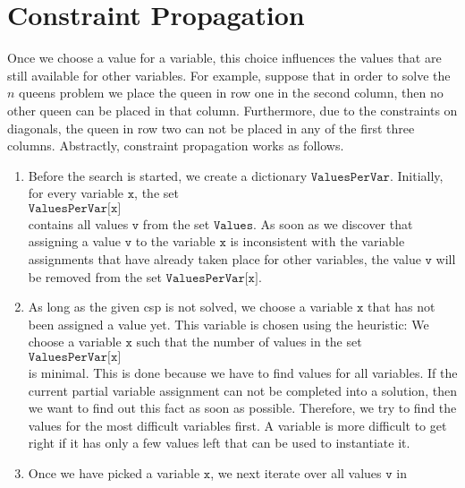 \section{Constraint Propagation}
Once we choose a value for a variable, this choice influences the values that are still available for other variables.
For example, suppose that in order to solve the $n$ queens problem we place the queen in row one in the second
column, then no other queen can be placed in 
that column.   Furthermore, due to the constraints on diagonals, the queen in row two can not be placed
in any of the first three columns.  Abstractly, constraint propagation works as follows.
\begin{enumerate}
\item Before the search is started, we create a dictionary $\texttt{ValuesPerVar}$.  Initially, for every variable
      $\texttt{x}$,  the set
      \\[0.2cm]
      \hspace*{1.3cm}
      $\texttt{ValuesPerVar[x]}$ 
      \\[0.2cm]
      contains all values $\texttt{v}$ from the set $\texttt{Values}$.  As soon as we discover that assigning a
      value $\texttt{v}$ to the variable $\texttt{x}$ is inconsistent with the variable
      assignments that have already taken place for other variables, the value $\texttt{v}$ will be removed from the set
      $\texttt{ValuesPerVar[x]}$. 
\item As long as the given \ac{csp} is not solved,  we choose a variable $\texttt{x}$ that has not been assigned a
      value yet.  This variable is chosen using the 
       heuristic:  We choose a
      variable $\texttt{x}$ such that the number of values in the set
      \\[0.2cm]
      \hspace*{1.3cm}
      $\texttt{ValuesPerVar[x]}$ 
      \\[0.2cm]
      is minimal.  This is done because we have to
      find values for all variables.  If the current partial variable assignment can not be completed into a
      solution, then we want to find out this fact as soon as possible.  Therefore, we try to find the values
      for the most difficult variables first.  A variable is more difficult to get right if it has only a few
      values left that can be used to instantiate it.
\item Once we have picked a variable $\texttt{x}$, we next iterate over all values $\texttt{v}$ in

\end{enumerate}
